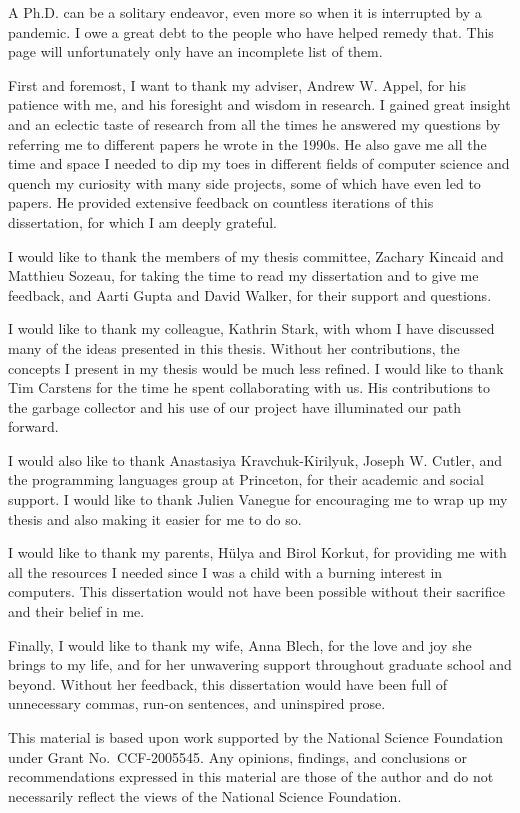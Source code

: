 A Ph.D. can be a solitary endeavor, even more so when it is interrupted by a pandemic. I owe a great debt to the people who have helped remedy that. This page will unfortunately only have an incomplete list of them.

First and foremost, I want to thank my adviser, Andrew W. Appel, for his patience with me, and his foresight and wisdom in research. I gained great insight and an eclectic taste of research from all the times he answered my questions by referring me to different papers he wrote in the 1990s. He also gave me all the time and space I needed to dip my toes in different fields of computer science and quench my curiosity with many side projects, some of which have even led to papers. He provided extensive feedback on countless iterations of this dissertation, for which I am deeply grateful. 

I would like to thank the members of my thesis committee, Zachary Kincaid and Matthieu Sozeau, for taking the time to read my dissertation and to give me feedback, and Aarti Gupta and David Walker, for their support and questions.

I would like to thank my colleague, Kathrin Stark, with whom I have discussed many of the ideas presented in this thesis. Without her contributions, the concepts I present in my thesis would be much less refined. I would like to thank Tim Carstens for the time he spent collaborating with us. His contributions to the garbage collector and his use of our project have illuminated our path forward.

I would also like to thank Anastasiya Kravchuk-Kirilyuk, Joseph W. Cutler, and the programming languages group at Princeton, for their academic and social support. I would like to thank Julien Vanegue for encouraging me to wrap up my thesis and also making it easier for me to do so.

I would like to thank my parents, Hülya and Birol Korkut, for providing me with all the resources I needed since I was a child with a burning interest in computers. This dissertation would not have been possible without their sacrifice and their belief in me.

Finally, I would like to thank my wife, Anna Blech, for the love and joy she brings to my life, and for her unwavering support throughout graduate school and beyond. Without her feedback, this dissertation would have been full of unnecessary commas, run-on sentences, and uninspired prose.

\newpage

This material is based upon work supported by the National Science Foundation under Grant No.\ CCF-2005545. Any opinions, findings, and conclusions or recommendations expressed in this material are those of the author and do not necessarily reflect the views of the National Science Foundation.